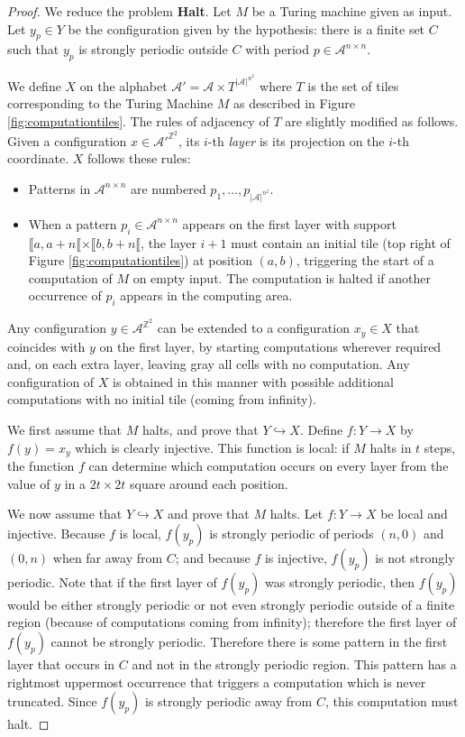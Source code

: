 \documentclass[a4paper]{article}
\newcommand{\Z}{\mathbb{Z}}
\newcommand{\A}{\mathcal{A}}
\theoremstyle{definition}
\begin{document}
\begin{proof}
We reduce the problem \textbf{Halt}. Let $M$ be a Turing machine given as input. Let $y_p \in Y$ be the configuration given by the hypothesis: there is a finite set $C$ such that $y_p$ is strongly periodic outside $C$ with period $p \in \A^{n \times n}$.

We define $X$ on the alphabet $\A'=\A \times T^{|\A|^{n^2}}$ where $T$ is the set of tiles corresponding to the Turing Machine $M$ as described in Figure \ref{fig:computationtiles}. The rules of adjacency of $T$ are slightly modified as follows. Given a configuration $x\in\A'^{\Z^2}$, its $i$-th \emph{layer} is its projection on the $i$-th coordinate. $X$ follows these rules:

\begin{itemize}	
    \item Patterns in $\A^{n \times n}$ are numbered $p_1, \dots, p_{|\A|^{n^2}}$.
	\item When a pattern $p_i\in \A^{n \times n}$ appears on the first layer with support $\llbracket a,a+n\llbracket\times \llbracket b,b+n\llbracket$, the layer $i+1$ must contain an initial tile (top right of Figure \ref{fig:computationtiles}) at position $(a,b)$, triggering the start of a computation of $M$ on empty input.
    The computation is halted if another occurrence of $p_i$ appears in the computing area.
\end{itemize}

Any configuration $y \in \A^{\Z^2}$ can be extended to a configuration $x_y \in X$ that coincides with $y$ on the first layer, by starting computations wherever required and, on each extra layer, leaving gray all cells with no computation. Any configuration of $X$ is obtained in this manner with possible additional computations with no initial tile (coming from infinity).

We first assume that $M$ halts, and prove that $Y \hookrightarrow X$. Define $f:Y\rightarrow X$ by $f(y)=x_y$ which is clearly injective. This function is local: if $M$ halts in $t$ steps, the function $f$ can determine which computation occurs on every layer from the value of $y$ in a $2t \times 2t$ square around each position. 

We now assume that $Y \hookrightarrow X$ and prove that $M$ halts. Let $f:Y\rightarrow X$ be local and injective. Because $f$ is local, $f(y_p)$ is strongly periodic of periods $(n,0)$ and $(0,n)$ when far away from $C$; and because $f$ is injective, $f(y_p)$ is not strongly periodic. Note that if the first layer of $f(y_p)$ was strongly periodic, then $f(y_p)$ would be either strongly periodic or not even strongly periodic outside of a finite region (because of computations coming from infinity); therefore the first layer of $f(y_p)$ cannot be strongly periodic. Therefore there is some pattern in the first layer that occurs in $C$ and not in the strongly periodic region. This pattern has a rightmost uppermost occurrence that triggers a computation which is never truncated. Since $f(y_p)$ is strongly periodic away from $C$, this computation must halt.
\end{proof}
\end{document}
